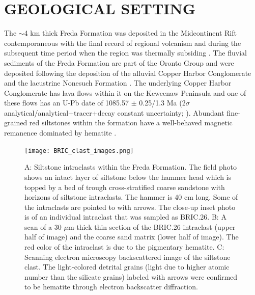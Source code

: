 \documentclass[11pt,letterpaper]{article}
\begin{document}
\section*{GEOLOGICAL SETTING}

The $\sim$4 km thick Freda Formation was deposited in the Midcontinent Rift contemporaneous with the final record of regional volcanism and during the subsequent time period when the region was thermally subsiding \citep{Cannon1992a}. The fluvial sediments of the Freda Formation are part of the Oronto Group and were deposited following the deposition of the alluvial Copper Harbor Conglomerate and the lacustrine Nonesuch Formation \citep{Ojakangas2001a}. The underlying Copper Harbor Conglomerate has lava flows within it on the Keweenaw Peninsula and one of these flows has an U-Pb date of 1085.57 $\pm$ 0.25/1.3 Ma (2$\sigma$ analytical/analytical+tracer+decay constant uncertainty; \citealp{Fairchild2017a}). Abundant fine-grained red siltstones within the formation have a well-behaved magnetic remanence dominated by hematite \citep{Henry1977a}.

\begin{figure}[!ht]
\centering
\noindent\texttt{[image: BRIC\_clast\_images.png]}
\caption{\small{A: Siltstone intraclasts within the Freda Formation. The field photo shows an intact layer of siltstone below the hammer head which is topped by a bed of trough cross-stratified coarse sandstone with horizons of siltstone intraclasts. The hammer is 40 cm long. Some of the intraclasts are pointed to with arrows. The close-up inset photo is of an individual intraclast that was sampled as BRIC.26. B: A scan of a 30 $\mu$m-thick thin section of the BRIC.26 intraclast (upper half of image) and the coarse sand matrix (lower half of image). The red color of the intraclast is due to the pigmentary hematite. C: Scanning electron microscopy backscattered image of the siltstone clast. The light-colored detrital grains (light due to higher atomic number than the silicate grains) labeled with arrows were confirmed to be hematite through electron backscatter diffraction.}}
\label{fig:intraclast_images}
\end{figure} 
\end{document}
